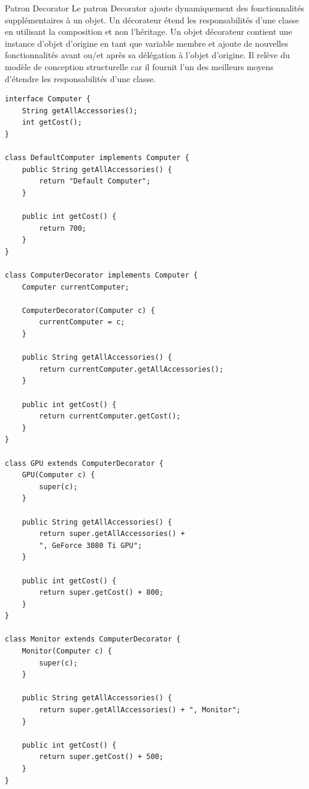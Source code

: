 \documentclass[16pt]{report}
\begin{document}
\begin{multicols*}{2}
        \begin{Concept}{Patron Decorator}{}
                Le patron Decorator ajoute dynamiquement des fonctionnalités supplémentaires
                à un objet.
                Un décorateur étend les responsabilités d'une classe en utilisant la composition et 
                non l'héritage. Un objet décorateur contient une instance d'objet d'origine en tant que variable
                membre et ajoute de nouvelles fonctionnalités avant ou/et après sa délégation à
                l'objet d'origine. Il relève du modèle de conception structurelle car il fournit l'un des meilleurs 
                moyens d'étendre les responsabilités d'une classe.
            
        \end{Concept}

\begin{lstlisting}[style=JavaDraculaWhite]
interface Computer {
    String getAllAccessories();
    int getCost();
}

class DefaultComputer implements Computer {
    public String getAllAccessories() {
        return "Default Computer";
    }

    public int getCost() {
        return 700;
    }
}

class ComputerDecorator implements Computer {
    Computer currentComputer;

    ComputerDecorator(Computer c) {
        currentComputer = c;
    }

    public String getAllAccessories() {
        return currentComputer.getAllAccessories();
    }

    public int getCost() {
        return currentComputer.getCost();
    }
}

class GPU extends ComputerDecorator {
    GPU(Computer c) {
        super(c);
    }

    public String getAllAccessories() {
        return super.getAllAccessories() +
        ", GeForce 3080 Ti GPU";
    }

    public int getCost() {
        return super.getCost() + 800;
    }
}

class Monitor extends ComputerDecorator {
    Monitor(Computer c) {
        super(c);
    }

    public String getAllAccessories() {
        return super.getAllAccessories() + ", Monitor";
    }

    public int getCost() {
        return super.getCost() + 500;
    }
}

\end{lstlisting}



\end{multicols*}
\end{document}
